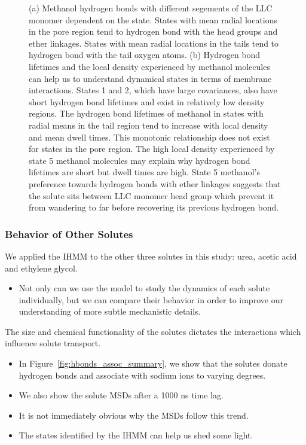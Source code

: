 \documentclass{article}
\begin{document}
\begin{figure}
\begin{subfigure}{0.45\textwidth}
  \caption{}\label{fig:hbond_lifetimes_density_MET}
  \end{subfigure}
  \caption{(a) Methanol hydrogen bonds with different segements of the LLC monomer
  dependent on the state. States with mean radial locations in the pore region tend to
  hydrogen bond with the head groups and ether linkages. States with mean radial
  locations in the tails tend to hydrogen bond with the tail oxygen atoms.
  (b) Hydrogen bond lifetimes and the local density experienced by methanol
  molecules can help us to understand dynamical states in terms of membrane 
  interactions. States 1 and 2, which have large covariances, also have short
  hydrogen bond lifetimes and exist in relatively low density regions. The
  hydrogen bond lifetimes of methanol in states with radial means in the tail
  region tend to increase with local density and mean dwell times. This monotonic
  relationship does not exist for states in the pore region. The high 
  local density experienced by state 5 methanol molecules may explain why 
  hydrogen bond lifetimes are short but dwell times are high. State 5 methanol's
  preference towards hydrogen bonds with ether linkages suggests that the solute
  sits between LLC monomer head group which prevent it from wandering to far
  before recovering its previous hydrogen bond.
  }\label{fig:hbond_pichart}
  \end{figure}
  
  
  \subsubsection*{Behavior of Other Solutes}
  
  We applied the IHMM to the other three solutes in this study: urea, acetic acid
  and ethylene glycol. 
  \begin{itemize}  
    \item Not only can we use the model to study the dynamics of each solute 
    individually, but we can compare their behavior in order to improve our
    understanding of more subtle mechanistic details.
  \end{itemize} 
  
  The size and chemical functionality of the solutes dictates the interactions which
  influence solute transport. 
  \begin{itemize}  
    \item In Figure~\ref{fig:hbonds_assoc_summary}, we show that the solutes 
    donate hydrogen bonds and associate with sodium ions to varying degrees.
    \item We also show the solute MSDs after a 1000 ns time lag. 
    \item It is not immediately obvious why the MSDs follow this trend.
    \item The states identified by the IHMM can help us shed some light.
  \end{itemize}
  
\end{document}
